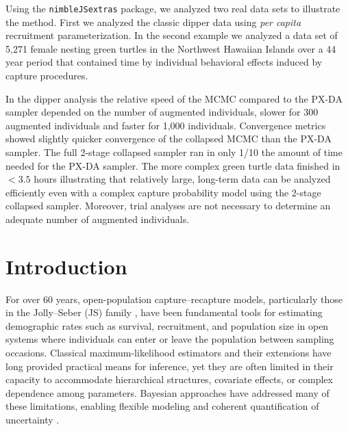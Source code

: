 \documentclass[12pt]{article}
\begin{document}
Using the \verb|nimbleJSextras| package, we analyzed two real data sets to illustrate the method. First we analyzed the classic dipper data using {\it per capita} recruitment parameterization. In the second example we analyzed a data set of 5,271 female nesting green turtles in the Northwest Hawaiian Islands over a 44 year period that contained time by individual behavioral effects induced by capture procedures. 

In the dipper analysis the relative speed of the MCMC compared to the PX-DA sampler depended on the number of augmented individuals, slower for 300 augmented individuals and faster for 1,000 individuals. Convergence metrics showed slightly quicker convergence of the collapsed MCMC than the PX-DA sampler. The full 2-stage collapsed sampler ran in only 1/10 the amount of time needed for the PX-DA sampler. The more complex green turtle data finished in $<3.5$ hours illustrating that relatively large, long-term data can be analyzed efficiently even with a complex capture probability model using the 2-stage collapsed sampler. Moreover, trial analyses are not necessary to determine an adequate number of augmented individuals. 

\bigskip



\raggedright
\setlength{\parindent}{2em}
\raggedbottom


\section{Introduction}

For over 60 years, open-population capture–recapture models, particularly those in the Jolly–Seber (JS) family \citep{Jolly1965,Seber1965}, have been fundamental tools for estimating demographic rates such as survival, recruitment, and population size in open systems where individuals can enter or leave the population between sampling occasions. Classical maximum-likelihood estimators and their extensions \citep{schwarz1996general} have long provided practical means for inference, yet they are often limited in their capacity to accommodate hierarchical structures, covariate effects, or complex dependence among parameters. Bayesian approaches have addressed many of these limitations, enabling flexible modeling and coherent quantification of uncertainty \citep{Royle:2008kx}. 
\end{document}
